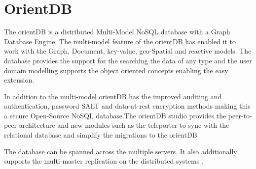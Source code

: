 \section{OrientDB}
The orientDB  is a distributed Multi-Model NoSQL database with a 
Graph Database Engine. The multi-model feature of the orientDB has 
enabled it to work with the Graph, Document, key-value, geo-Spatial 
and reactive models. The database provides the support for the searching 
the data of any type and the user domain modelling supports 
the object oriented concepts enabling the easy extension. 

In addition to the multi-model orientDB has the improved auditing and 
authentication, password SALT and data-at-rest encryption methods making 
this a secure Open-Source NoSQL database.The orientDB studio provides the 
peer-to-peer architecture and new modules such as the teleporter to sync 
with the relational database and simplify the migrations to the orientDB.

The database can be spanned across the multiple servers. It also additionally 
supports the multi-master replication on the 
distributed systems \cite{hid-sp18-412-orientDB_by_CallidusCloud}.

